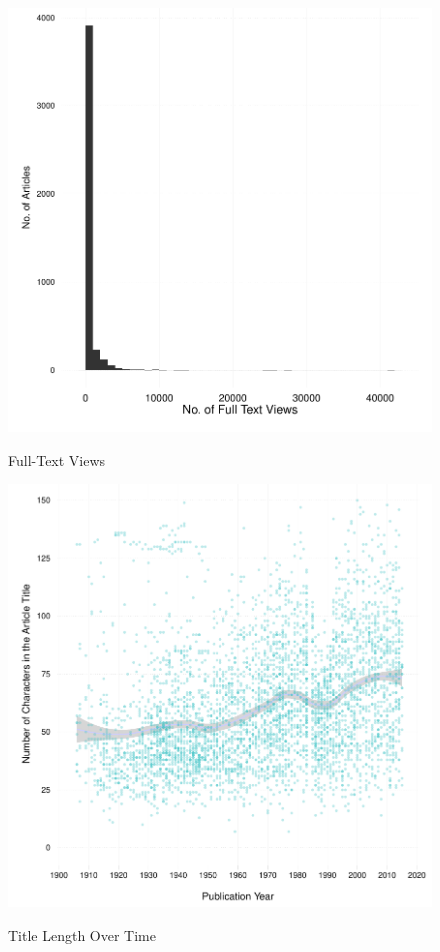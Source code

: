 \documentclass[12pt]{article}
\begin{document}
\begin{figure}[htbp]
\centering
\caption{Full-Text Views}
\includegraphics[scale=.85]{../figs/fulltext_views.pdf}
\label{fig:fulltext}
\end{figure}

\begin{figure}[htbp]
\centering
\caption{Title Length Over Time}
\includegraphics[scale=.85]{../figs/title_len_over_time.pdf}
\label{fig:fulltext}
\end{figure}

\clearpage


\end{document}

